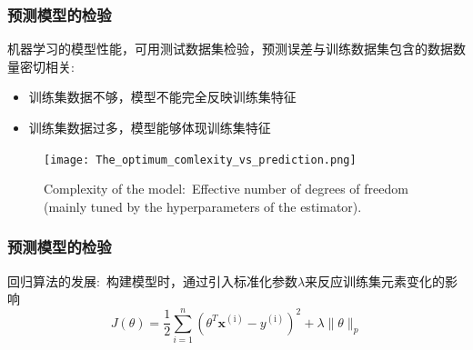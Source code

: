 \frame
{
	\frametitle{预测模型的检验}
机器学习的模型性能，可用测试数据集检验，预测误差与训练数据集包含的数据数量密切相关:
\begin{itemize}
	\item 训练集数据不够，模型不能完全反映训练集特征\\
		{\fontsize{8.0pt}{4.2pt}\selectfont{预测结果将会表现出明显的偏差}}
	\item 训练集数据过多，模型能够体现训练集特征\\
		{\fontsize{8.0pt}{4.2pt}}
\end{itemize}
\begin{figure}[h!]
\centering
\vspace*{-0.1in}
\texttt{[image: The\_optimum\_comlexity\_vs\_prediction.png]}
\caption{\tiny{\textrm{Complexity of the model:~Effective number of degrees of freedom (mainly tuned by the hyperparameters of the estimator).}}}%
\label{ML_Fitting_Error}
\end{figure}
}

\frame
{
	\frametitle{预测模型的检验}
回归算法的发展:~构建模型时，通过引入标准化参数$\lambda$来反应训练集元素变化的影响
\begin{displaymath}
	J(\theta)=\dfrac12\sum_{i=1}^n(\theta^T\mathbf{x}^{(\mathrm{i})}-y^{(\mathrm{i})})^2+\lambda\|\theta\|_p
\end{displaymath}
{\fontsize{7.0pt}{4.2pt}\selectfont{这里$p$表示数据度量形式}}
\vskip 4pt
{\fontsize{8.0pt}{4.2pt}}
\vskip 2pt
{\fontsize{6.0pt}{4.2pt}\selectfont{一般是通过比较几个不同的$\lambda$值，选其中能最大化预测能力又不会引入太大偏差的一个}}
}

